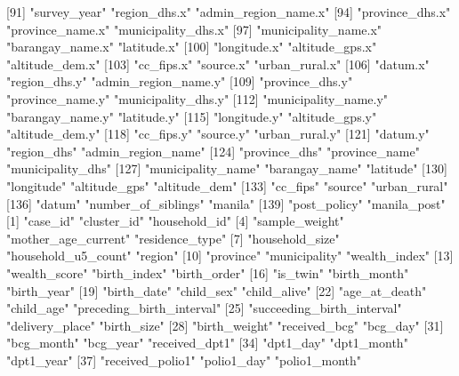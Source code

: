 [91] "survey_year"               "region_dhs.x"              "admin_region_name.x"      
 [94] "province_dhs.x"            "province_name.x"           "municipality_dhs.x"       
 [97] "municipality_name.x"       "barangay_name.x"           "latitude.x"               
[100] "longitude.x"               "altitude_gps.x"            "altitude_dem.x"           
[103] "cc_fips.x"                 "source.x"                  "urban_rural.x"            
[106] "datum.x"                   "region_dhs.y"              "admin_region_name.y"      
[109] "province_dhs.y"            "province_name.y"           "municipality_dhs.y"       
[112] "municipality_name.y"       "barangay_name.y"           "latitude.y"               
[115] "longitude.y"               "altitude_gps.y"            "altitude_dem.y"           
[118] "cc_fips.y"                 "source.y"                  "urban_rural.y"            
[121] "datum.y"                   "region_dhs"                "admin_region_name"        
[124] "province_dhs"              "province_name"             "municipality_dhs"         
[127] "municipality_name"         "barangay_name"             "latitude"                 
[130] "longitude"                 "altitude_gps"              "altitude_dem"             
[133] "cc_fips"                   "source"                    "urban_rural"              
[136] "datum"                     "number_of_siblings"        "manila"                   
[139] "post_policy"               "manila_post"              
  [1] "case_id"                   "cluster_id"                "household_id"             
  [4] "sample_weight"             "mother_age_current"        "residence_type"           
  [7] "household_size"            "household_u5_count"        "region"                   
 [10] "province"                  "municipality"              "wealth_index"             
 [13] "wealth_score"              "birth_index"               "birth_order"              
 [16] "is_twin"                   "birth_month"               "birth_year"               
 [19] "birth_date"                "child_sex"                 "child_alive"              
 [22] "age_at_death"              "child_age"                 "preceding_birth_interval" 
 [25] "succeeding_birth_interval" "delivery_place"            "birth_size"               
 [28] "birth_weight"              "received_bcg"              "bcg_day"                  
 [31] "bcg_month"                 "bcg_year"                  "received_dpt1"            
 [34] "dpt1_day"                  "dpt1_month"                "dpt1_year"                
 [37] "received_polio1"           "polio1_day"                "polio1_month"             
